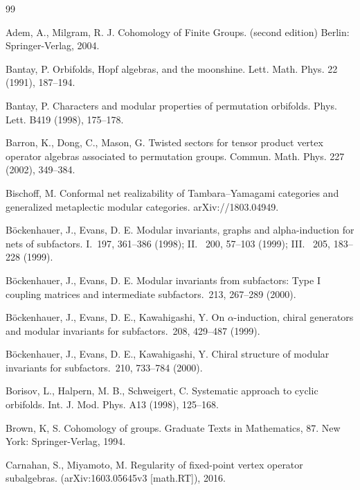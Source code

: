 \documentclass[12pt]{article}
\numberwithin{equation}{section}
\begin{document}
                  \begin{thebibliography}{99}
    \begin{scriptsize}


    \setlength{\parskip}{-1ex}

 {Adem, A., Milgram, R. J.} {Cohomology of Finite Groups.} (second edition) Berlin: Springer-Verlag,  2004.



 {Bantay, P.} {Orbifolds, Hopf algebras, and the moonshine.} Lett. Math. Phys. 22 (1991), 187--194.

 {Bantay, P.} {Characters and modular properties of permutation orbifolds.} Phys. Lett. B419 (1998), 175--178.


 {Barron, K., Dong, C., Mason, G.} {Twisted sectors for tensor product vertex operator algebras associated to permutation groups.} {Commun. Math. Phys.} 227 (2002), 349--384.

 {Bischoff, M.} {Conformal net realizability of Tambara--Yamagami categories and generalized metaplectic modular categories.} arXiv://1803.04949.


{B\"ockenhauer, J., Evans, D. E.}
{Modular invariants, graphs and alpha-induction for
nets of subfactors. I.} {\CMP \,{197}, {361--386} {(1998)}; II. \CMP \, {200},
{57--103} {(1999)}; III. \CMP \, {205}, {183--228} {(1999)}}. 

{B\"ockenhauer, J., Evans, D. E.}
{Modular invariants from subfactors: Type I coupling
matrices and intermediate subfactors.} \CMP\,{213}, {267--289} {(2000)}.


{B\"ockenhauer, J., Evans, D. E., Kawahigashi, Y.}
{On $\alpha$-induction, chiral generators and modular
invariants for subfactors.} \CMP\,{208}, {429--487} {(1999)}.

{B\"ockenhauer, J., Evans, D. E., Kawahigashi, Y.}
{Chiral structure of modular invariants for subfactors.}
\CMP\,{210}, {733--784} {(2000)}.

 {Borisov, L., Halpern, M. B., Schweigert, C.} {Systematic approach to cyclic orbifolds.} {Int. J. Mod. Phys.} A13 (1998), 125--168.


 {Brown, K, S.}
{Cohomology of groups.} 
{Graduate Texts in Mathematics, 87. New York: Springer-Verlag,  1994.}


 {Carnahan, S., Miyamoto, M.} {Regularity of fixed-point vertex operator subalgebras.} (arXiv:1603.05645v3 [math.RT]), 2016.



\end{scriptsize}
\end{thebibliography}
\end{document}

